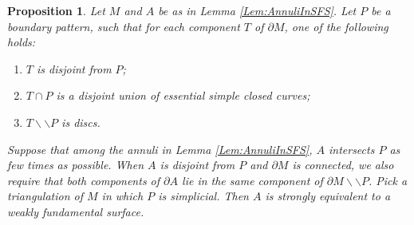 \documentclass[10pt,a4paper]{amsart}
\newtheorem{proposition}{Proposition}
\newcommand{\cut}{\backslash\backslash}
\begin{document}
\begin{proposition}
\label{Prop:AnnuliWeaklyFundamental}
Let $M$ and $A$ be as in Lemma \ref{Lem:AnnuliInSFS}. Let $P$ be a boundary pattern, such that for
each component $T$ of $\partial M$, one of the following holds:
\begin{enumerate}
\item $T$ is disjoint from $P$;
\item $T \cap P$ is a disjoint union of essential simple closed curves;
\item $T \cut P$ is discs.
\end{enumerate}
Suppose that among the annuli in Lemma \ref{Lem:AnnuliInSFS}, $A$ intersects $P$ as few times as possible.
When $A$ is disjoint from $P$ and $\partial M$ is connected, we also require that both components of
$\partial A$ lie in the same component of $\partial M \cut P$. Pick a triangulation of $M$ in which
$P$ is simplicial. Then $A$ is strongly equivalent to a
weakly fundamental surface.
\end{proposition}
\end{document}
